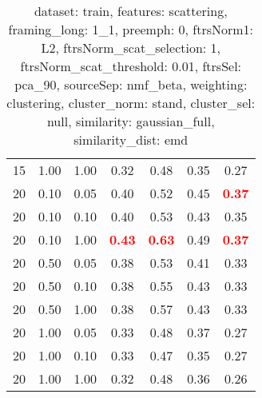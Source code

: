 \begin{table}
\begin{center}
\begin{tabular}{lllcccc}
15 & 1.00 & 1.00 & 0.32 & 0.48 & 0.35 & 0.27 \\ 
20 & 0.10 & 0.05 & 0.40 & 0.52 & 0.45 & \textbf{\textcolor{red}{0.37}} \\ 
20 & 0.10 & 0.10 & 0.40 & 0.53 & 0.43 & 0.35 \\ 
20 & 0.10 & 1.00 & \textbf{\textcolor{red}{0.43}} & \textbf{\textcolor{red}{0.63}} & 0.49 & \textbf{\textcolor{red}{0.37}} \\ 
20 & 0.50 & 0.05 & 0.38 & 0.53 & 0.41 & 0.33 \\ 
20 & 0.50 & 0.10 & 0.38 & 0.55 & 0.43 & 0.33 \\ 
20 & 0.50 & 1.00 & 0.38 & 0.57 & 0.43 & 0.33 \\ 
20 & 1.00 & 0.05 & 0.33 & 0.48 & 0.37 & 0.27 \\ 
20 & 1.00 & 0.10 & 0.33 & 0.47 & 0.35 & 0.27 \\ 
20 & 1.00 & 1.00 & 0.32 & 0.48 & 0.36 & 0.26 \\ 
\end{tabular} 
\end{center} 
\caption{dataset: train, features: scattering, framing\_long: 1\_1, preemph: 0, ftrsNorm1: L2, ftrsNorm\_scat\_selection: 1, ftrsNorm\_scat\_threshold: 0.01, ftrsSel: pca\_90, sourceSep: nmf\_beta, weighting: clustering, cluster\_norm: stand, cluster\_sel: null, similarity: gaussian\_full, similarity\_dist: emd} 
\label{datasetrFeaturscFraminlong1_1Preemp0Ftrsnorm1L2Ftrsnoscatselect1Ftrsnoscatthresh0.01Ftrsselpc90SourcesepnmbeWeightclClustenormstClusteselnuSimilagafuSimiladistem} 
\end{table} 
 
